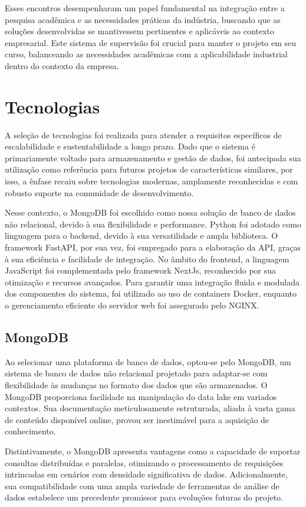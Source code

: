Esses encontros desempenharam um papel fundamental na integração entre a pesquisa acadêmica e as necessidades práticas da indústria, buscando que as soluções desenvolvidas se mantivessem pertinentes e aplicáveis ao contexto empresarial. Este sistema de supervisão foi crucial para manter o projeto em seu curso, balanceando as necessidades acadêmicas com a aplicabilidade industrial dentro do contexto da empresa.


\section[Tecnologias]{Tecnologias}
A seleção de tecnologias foi realizada para atender a requisitos específicos de escalabilidade e sustentabilidade a longo prazo. Dado que o sistema é primariamente voltado para armazenamento e gestão de dados, foi antecipada sua utilização como referência para futuros projetos de características similares, por isso, a ênfase recaiu sobre tecnologias modernas, amplamente reconhecidas e com robusto suporte na comunidade de desenvolvimento.

Nesse contexto, o MongoDB foi escolhido como nossa solução de banco de dados não relacional, devido à sua flexibilidade e performance. Python foi adotado como linguagem para o backend, devido à sua versatilidade e ampla biblioteca. O framework FastAPI, por sua vez, foi empregado para a elaboração da API, graças à sua eficiência e facilidade de integração. No âmbito do frontend, a linguagem JavaScript foi complementada pelo framework NextJs, reconhecido por sua otimização e recursos avançados. Para garantir uma integração fluida e modulada dos componentes do sistema, foi utilizado ao uso de containers Docker, enquanto o gerenciamento eficiente do servidor web foi assegurado pelo NGINX.

\subsection{MongoDB}
Ao selecionar uma plataforma de banco de dados, optou-se pelo MongoDB, um sistema de banco de dados não relacional projetado para adaptar-se com flexibilidade às mudanças no formato dos dados que são armazenados. O MongoDB proporciona facilidade na manipulação do data lake em variados contextos. Sua documentação meticulosamente estruturada, aliada à vasta gama de conteúdo disponível online, provou ser inestimável para a aquisição de conhecimento.

Distintivamente, o MongoDB apresenta vantagens como a capacidade de suportar consultas distribuídas e paralelas, otimizando o processamento de requisições intrincadas em cenários com densidade significativa de dados. Adicionalmente, sua compatibilidade com uma ampla variedade de ferramentas de análise de dados estabelece um precedente promissor para evoluções futuras do projeto.

